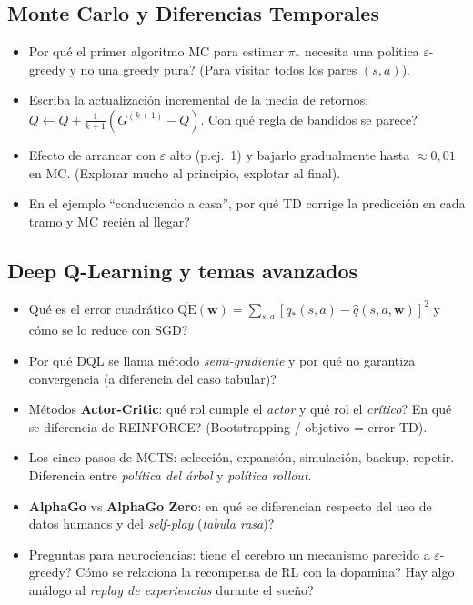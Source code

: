 \documentclass[11pt, a4paper]{article}
\begin{document}
\subsection*{Monte Carlo y Diferencias Temporales}
\begin{itemize}[nosep]
    \item \textquestiondown Por qu\'e el primer algoritmo MC para estimar $\pi_*$ necesita una pol\'itica $\varepsilon$-greedy y no una greedy pura? (Para visitar todos los pares $(s,a)$).
    \item Escriba la actualizaci\'on incremental de la media de retornos: $Q \leftarrow Q + \frac{1}{k+1}(G^{(k+1)}-Q)$. \textquestiondown Con qu\'e regla de bandidos se parece?
    \item Efecto de arrancar con $\varepsilon$ alto (p.ej.\ 1) y bajarlo gradualmente hasta $\approx 0{,}01$ en MC. (Explorar mucho al principio, explotar al final).
    \item En el ejemplo ``conduciendo a casa'', \textquestiondown por qu\'e TD corrige la predicci\'on en cada tramo y MC reci\'en al llegar?
\end{itemize}

\subsection*{Deep Q-Learning y temas avanzados}
\begin{itemize}[nosep]
    \item \textquestiondown Qu\'e es el error cuadr\'atico $\overline{\mathrm{QE}}(\mathbf{w})=\sum_{s,a}[q_*(s,a)-\hat q(s,a,\mathbf{w})]^2$ y c\'omo se lo reduce con SGD?
    \item \textquestiondown Por qu\'e DQL se llama m\'etodo \emph{semi-gradiente} y por qu\'e no garantiza convergencia (a diferencia del caso tabular)?
    \item M\'etodos \textbf{Actor-Critic}: \textquestiondown qu\'e rol cumple el \emph{actor} y qu\'e rol el \emph{cr\'itico}? \textquestiondown En qu\'e se diferencia de REINFORCE? (Bootstrapping / objetivo = error TD).
    \item Los cinco pasos de MCTS: selecci\'on, expansi\'on, simulaci\'on, backup, repetir. Diferencia entre \emph{pol\'itica del \'arbol} y \emph{pol\'itica rollout}.
    \item \textbf{AlphaGo} vs \textbf{AlphaGo Zero}: \textquestiondown en qu\'e se diferencian respecto del uso de datos humanos y del \emph{self-play} (\emph{tabula rasa})?
    \item Preguntas para neurociencias: \textquestiondown tiene el cerebro un mecanismo parecido a $\varepsilon$-greedy? \textquestiondown C\'omo se relaciona la recompensa de RL con la dopamina? \textquestiondown Hay algo an\'alogo al \emph{replay de experiencias} durante el sue\~no?
\end{itemize}
\end{document}
